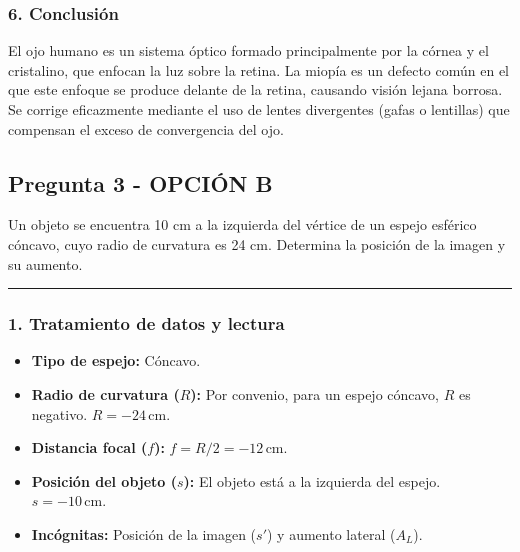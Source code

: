 \subsubsection*{6. Conclusión}
\begin{cajaconclusion}
El ojo humano es un sistema óptico formado principalmente por la córnea y el cristalino, que enfocan la luz sobre la retina. La miopía es un defecto común en el que este enfoque se produce delante de la retina, causando visión lejana borrosa. Se corrige eficazmente mediante el uso de lentes divergentes (gafas o lentillas) que compensan el exceso de convergencia del ojo.
\end{cajaconclusion}

\newpage

\subsection{Pregunta 3 - OPCIÓN B}
\label{subsec:3B_2008_sep_ext}

\begin{cajaenunciado}
Un objeto se encuentra 10 cm a la izquierda del vértice de un espejo esférico cóncavo, cuyo radio de curvatura es 24 cm. Determina la posición de la imagen y su aumento.
\end{cajaenunciado}
\hrule

\subsubsection*{1. Tratamiento de datos y lectura}
\begin{itemize}
    \item \textbf{Tipo de espejo:} Cóncavo.
    \item \textbf{Radio de curvatura ($R$):} Por convenio, para un espejo cóncavo, $R$ es negativo. $R = -24 \, \text{cm}$.
    \item \textbf{Distancia focal ($f$):} $f = R/2 = -12 \, \text{cm}$.
    \item \textbf{Posición del objeto ($s$):} El objeto está a la izquierda del espejo. $s = -10 \, \text{cm}$.
    \item \textbf{Incógnitas:} Posición de la imagen ($s'$) y aumento lateral ($A_L$).
\end{itemize}

